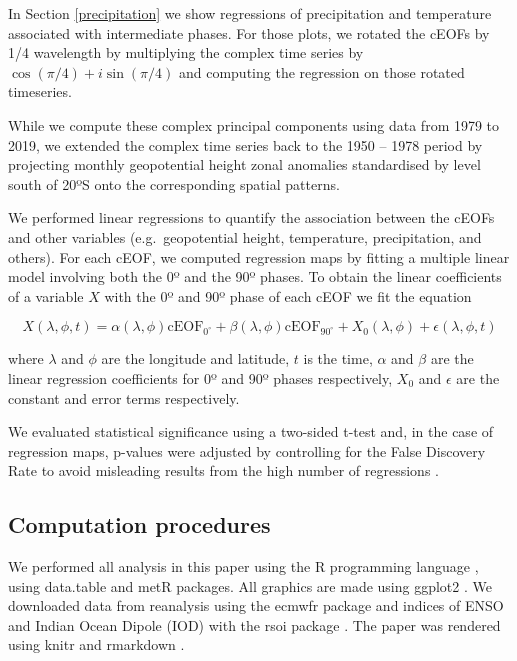 \documentclass[pdflatex,lineno,sn-basic]{sn-jnl}
\theoremstyle{thmstyleone}%
\theoremstyle{thmstyletwo}%
\theoremstyle{thmstylethree}%
\begin{document}
In Section \ref{precipitation} we show regressions of precipitation and temperature associated with intermediate phases.
For those plots, we rotated the cEOFs by 1/4 wavelength by multiplying the complex time series by \(\cos(\pi/4) + i\sin(\pi/4)\) and computing the regression on those rotated timeseries.

While we compute these complex principal components using data from 1979 to 2019, we extended the complex time series back to the 1950 -- 1978 period by projecting monthly geopotential height zonal anomalies standardised by level south of 20ºS onto the corresponding spatial patterns.

We performed linear regressions to quantify the association between the cEOFs and other variables (e.g.~geopotential height, temperature, precipitation, and others).
For each cEOF, we computed regression maps by fitting a multiple linear model involving both the 0º and the 90º phases.
To obtain the linear coefficients of a variable \(X\) with the 0º and 90º phase of each cEOF we fit the equation

\[
X(\lambda, \phi, t) = \alpha(\lambda, \phi) \operatorname{cEOF_{0^\circ}} + \beta(\lambda, \phi) \operatorname{cEOF_{90^\circ}} + X_0(\lambda, \phi) + \epsilon(\lambda, \phi, t)
\]

where \(\lambda\) and \(\phi\) are the longitude and latitude, \(t\) is the time, \(\alpha\) and \(\beta\) are the linear regression coefficients for 0º and 90º phases respectively, \(X_0\) and \(\epsilon\) are the constant and error terms respectively.

We evaluated statistical significance using a two-sided t-test and, in the case of regression maps, p-values were adjusted by controlling for the False Discovery Rate \citep{benjamini1995, wilks2016} to avoid misleading results from the high number of regressions \citep{walker1914, katz1991}.

\hypertarget{computation-procedures}{%
\subsection{Computation procedures}\label{computation-procedures}}

We performed all analysis in this paper using the R programming language \citep{rcoreteam2020}, using data.table \citep{dowle2020} and metR \citep{campitelli2020} packages.
All graphics are made using ggplot2 \citep{wickham2009}.
We downloaded data from reanalysis using the ecmwfr package \citep{hufkens2020} and indices of ENSO and Indian Ocean Dipole (IOD) with the rsoi package \citep{albers2020}.
The paper was rendered using knitr and rmarkdown \citep{xie2015, allaire2020}.
\end{document}
